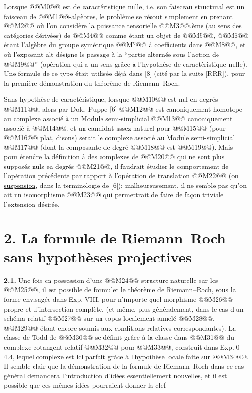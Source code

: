 
Lorsque @@M0@@ est de caractéristique nulle, i.e. son faisceau structural est un faisceau de @@M1@@-algèbres, le problème se résout simplement en prenant
@@M2@@
où l'on considère la puissance tensorielle @@M3@@.ème (au sens des catégories dérivées) de @@M4@@ comme étant un objet de @@M5@@, @@M6@@ étant l'algèbre du groupe symétrique @@M7@@ à coefficients dans @@M8@@, et où l'exposant alt désigne le passage à la ``partie alternée sous l'action de @@M9@@'' (opération qui a un sens grâce à l'hypothèse de caractéristique nulle). Une formule de ce type était utilisée déjà dans [8] (cité par la suite [RRR]), pour la première démonstration du théorème de Riemann--Roch.

Sans hypothèse de caractéristique, lorsque @@M10@@ est nul en degrés @@M11@@, alors par Dold--Puppe [6] @@M12@@ est canoniquement homotope au complexe associé à un Module semi-simplicial @@M13@@ canoniquement associé à @@M14@@, et un candidat assez naturel pour @@M15@@ (pour @@M16@@ plat, disons) serait le complexe associé au Module semi-simplicial @@M17@@ (dont la composante de degré @@M18@@ est @@M19@@). Mais pour étendre la définition à des complexes de @@M20@@ qui ne sont plus supposés nuls en degrés @@M21@@, il faudrait étudier le comportement de l'opération précédente par rapport à l'opération de translation @@M22@@ (ou \uline{suspension}, dans la terminologie de [6]); malheureusement, il ne semble pas qu'on ait un isomorphisme @@M23@@ qui permettrait de faire de façon triviale l'extension désirée.

\section*{2. La formule de Riemann--Roch sans hypothèses projectives}

\textbf{2.1.} Une fois en possession d'une @@M24@@-structure naturelle sur les @@M25@@, il est possible de formuler le théorème de Riemann--Roch, sous la forme envisagée dans Exp. VIII, pour n'importe quel morphisme @@M26@@ propre et d'intersection complète, (et même, plus généralement, dans le cas d'un schéma relatif @@M27@@ sur un topos localement annelé @@M28@@, @@M29@@ étant encore soumis aux conditions relatives correspondantes). La classe de Todd de @@M30@@ se définit grâce à la classe dans @@M31@@ du complexe cotangent relatif @@M32@@ pour @@M33@@, construit dans Exp. 0 4.4, lequel complexe est ici parfait grâce à l'hypothèse locale faite sur @@M34@@. Il semble clair que la démonstration de la formule de Riemann--Roch dans ce cas général demandera l'introduction d'idées essentiellement nouvelles, et il est possible que ces mêmes idées pourraient donner la clef 
